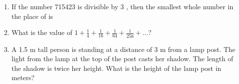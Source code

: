 \documentclass[a4paper, 11pt]{article}
\begin{document}
\begin{enumerate}
    \item If the number 715\underline{\hspace{0.5cm}}423 is divisible by 3 , then the smallest whole number in the place of \underline{\hspace{0.5cm}} is
    \begin{enumerate}
    \end{enumerate}

    \hfill{}

    \item What is the value of $1+\frac{1}{4}+\frac{1}{16}+\frac{1}{64}+\frac{1}{256}+\dots$?
    \begin{enumerate}
    \end{enumerate}

    \hfill{}

    \item A 1.5 m tall person is standing at a distance of 3 m from a lamp post. The light from the lamp at the top of the post casts her shadow. The length of the shadow is twice her height. What is the height of the lamp post in meters?
    \begin{enumerate}
    \end{enumerate}


\end{enumerate}
\end{document}
